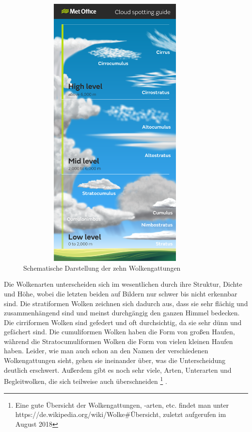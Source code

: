 \documentclass[a4,german]{article}
\begin{document}
\begin{figure}[h]
\centering
\includegraphics[width=10cm,height=14cm,keepaspectratio]{Cloud_infographic-01.png}
\caption{Schematische Darstellung der zehn Wolkengattungen}
    \label{fig:cloudtypes}
\end{figure}

Die Wolkenarten unterscheiden sich im wesentlichen durch ihre Struktur, Dichte und Höhe, wobei die letzten beiden auf Bildern nur schwer bis nicht erkennbar sind. Die stratiformen Wolken zeichnen sich dadurch aus, dass sie sehr flächig und zusammenhängend sind und meinst durchgängig den ganzen Himmel bedecken. Die cirriformen Wolken sind gefedert und oft durchsichtig, da sie sehr dünn und gefächert sind. Die cumuliformen Wolken haben die Form von großen Haufen, während die Stratocumuliformen Wolken die Form von vielen kleinen Haufen haben. Leider, wie man auch schon an den Namen der verschiedenen Wolkengattungen sieht, gehen sie ineinander über, was die Unterscheidung deutlich erschwert. Außerdem gibt es noch sehr viele, Arten, Unterarten und Begleitwolken, die sich teilweise auch überschneiden \footnote{Eine gute Übersicht der Wolkengattungen, -arten, etc. findet man unter\\ https://de.wikipedia.org/wiki/Wolke\#Übersicht, zuletzt aufgerufen im August 2018} . 
\end{document}
